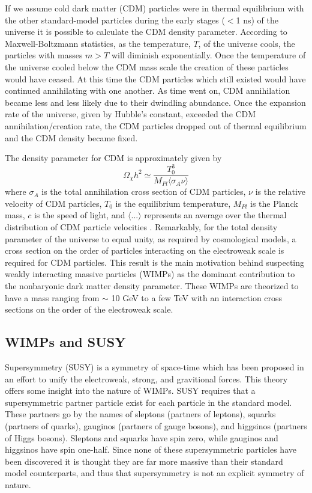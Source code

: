 \documentclass[a4paper,12pt]{article}
\begin{document}
If we assume cold dark matter (CDM) particles were in thermal equilibrium with the other standard-model particles during the early stages ($<$1 ns) of the universe it is possible to calculate the CDM density parameter.  According to Maxwell-Boltzmann statistics, as the temperature, $T$, of the universe cools, the particles with masses $m > T$ will diminish exponentially.  Once the temperature of the universe cooled below the CDM mass scale the creation of these particles would have ceased.  At this time the CDM particles which still existed would have continued annihilating with one another.  As time went on, CDM annihilation became less and less likely due to their dwindling abundance.  Once the expansion rate of the universe, given by Hubble's constant, exceeded the CDM annihilation/creation rate, the CDM particles dropped out of thermal equilibrium and the CDM density became fixed.  

The density parameter for CDM is approximately given by
\[\Omega_\chi h^2 \simeq \frac{T_0^3}{M_{Pl} \langle \sigma_A \nu \rangle} \]
where $\sigma_A$ is the total annihilation cross section of CDM particles, $\nu$ is the relative velocity of CDM particles, $T_0$ is the equilibrium temperature, $M_{Pl}$ is the Planck mass, $c$ is the speed of light, and $\langle ... \rangle$ represents an average over the thermal distribution of CDM particle velocities \cite{Kolb,Jungman}. Remarkably, for the total density parameter of the universe to equal unity, as required by cosmological models, a cross section on the order of particles interacting on the electroweak scale is required for CDM particles. This result is the main motivation behind suspecting weakly interacting massive particles (WIMPs) as the dominant contribution to the nonbaryonic dark matter density parameter.  These WIMPs are theorized to have a mass ranging from $\sim$ 10 GeV to a few TeV with an interaction cross sections on the order of the electroweak scale.  

\subsection{WIMPs and SUSY}

Supersymmetry (SUSY) is a symmetry of space-time which has been proposed in an effort to unify the electroweak, strong, and gravitional forces.  This theory offers some insight into the nature of WIMPs.  SUSY requires that a supersymmetric partner particle exist for each particle in the standard model.  These partners go by the names of sleptons (partners of leptons), squarks (partners of quarks), gauginos (partners of gauge bosons), and higgsinos (partners of Higgs bosons).  Sleptons and squarks have spin zero, while gauginos and higgsinos have spin one-half.  Since none of these supersymmetric particles have been discovered it is thought they are far more massive than their standard model counterparts, and thus that supersymmetry is not an explicit symmetry of nature.
  
\end{document}
